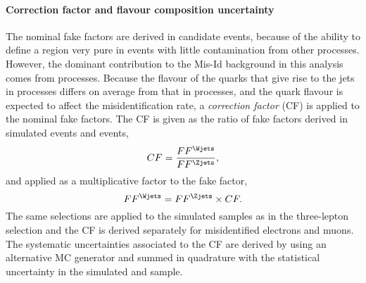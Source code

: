 \paragraph{Correction factor and flavour composition uncertainty}
The nominal fake factors are derived in \Zjets candidate events, because of the ability to define a region very pure in \Zjets events with little contamination from other processes. However, the dominant contribution to the Mis-Id background in this analysis comes from \Wjets processes. 
Because the flavour of the quarks that give rise to the jets in \Zjets processes differs on average from that in \Wjets processes, and the quark flavour is expected to affect the misidentification rate, a \emph{correction factor} (CF) is applied to the nominal fake factors.
The CF is given as the ratio of fake factors derived in simulated \Wjets events and \Zjets events, 
\begin{equation}
    CF = \frac{FF^{\Wjets}}{FF^{\Zjets}},
\end{equation}
and applied as a multiplicative factor to the fake factor,
\begin{equation}
    FF^{\Wjets} = FF^{\Zjets} \times CF.
\end{equation}
The same selections are applied to the simulated samples as in the three-lepton \Zjets selection and the CF is derived separately for misidentified electrons and muons. 
The systematic uncertainties associated to the CF are derived by using an alternative MC generator and summed in quadrature with the statistical uncertainty in the simulated \Wjets and \Zjets sample.


\begin{table}[ht]
    \begin{center}
    
    \end{center}
    \caption{Summary of the fake factors from the $Z$+jets estimate with uncertainties. All uncertainties are quoted in percent on the nominal value. More information on the different uncertainty components is given in the text.
    }
    \label{tab:ZjetsFF-uncertainties}
\end{table}
    
